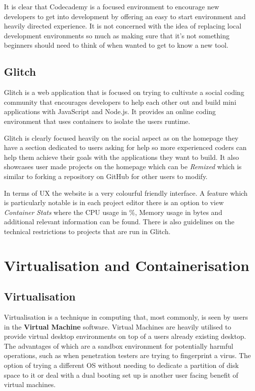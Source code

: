 It is clear that Codecademy is a focused environment to encourage new developers to get into development by offering an easy to start environment and heavily directed experience. It is not concerned with the idea of replacing local development environments so much as making sure that it's not something beginners should need to think of when wanted to get to know a new tool.

\subsection{Glitch}
Glitch is a web application that is focused on trying to cultivate a social coding community that encourages developers to help each other out and build mini applications with JavaScript and Node.js. It provides an online coding environment that uses containers to isolate the users runtime.

Glitch is clearly focused heavily on the social aspect as on the homepage they have a section dedicated to users asking for help so more experienced coders can help them achieve their goals with the applications they want to build. It also showcases user made projects on the homepage which can be \textit{Remixed} which is similar to forking a repository on GitHub for other users to modify.

In terms of UX the website is a very colourful friendly interface. A feature which is particularly notable is in each project editor there is an option to view \textit{Container Stats} where the CPU usage in \%, Memory usage in bytes and additional relevant information can be found. There is also guidelines on the technical restrictions to projects that are run in Glitch. 

\section{Virtualisation and Containerisation} \label{lit-containers}

\subsection{Virtualisation}

Virtualisation is a technique in computing that, most commonly, is seen by users in the \textbf{Virtual Machine} software. Virtual Machines are heavily utilised to provide virtual desktop environments on top of a users already existing desktop. The advantages of which are a sandbox environment for potentially harmful operations, such as when penetration testers are trying to fingerprint a virus. The option of trying a different OS without needing to dedicate a partition of disk space to it or deal with a dual booting set up is another user facing benefit of virtual machines.

